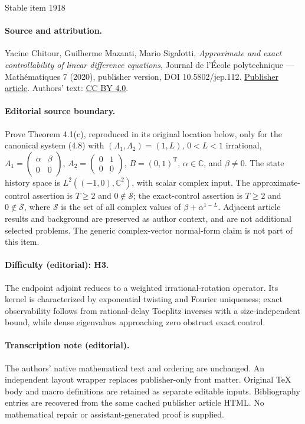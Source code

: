 \documentclass[10pt]{article}
\theoremstyle{plain}
\theoremstyle{definition}
\numberwithin{equation}{section}\numberwithin{figure}{section}\emergencystretch=3em
\begin{document}
\begin{center}{\Large Stable item 1918}\end{center}
\paragraph{Source and attribution.}
Yacine Chitour, Guilherme Mazanti, Mario Sigalotti, \emph{Approximate and exact controllability of linear difference equations}, Journal de l’École polytechnique — Mathématiques 7 (2020), publisher version, DOI 10.5802/jep.112. \href{https://jep.centre-mersenne.org/articles/10.5802/jep.112/}{Publisher article}. Authors' text: \href{https://creativecommons.org/licenses/by/4.0/}{CC BY 4.0}.
\paragraph{Editorial source boundary.}
Prove Theorem 4.1(c), reproduced in its original location below, only for the canonical system (4.8) with \((\Lambda_1,\Lambda_2)=(1,L)\), \(0<L<1\) irrational, \(A_1=\left(\begin{smallmatrix}\alpha&\beta\\0&0\end{smallmatrix}\right)\), \(A_2=\left(\begin{smallmatrix}0&1\\0&0\end{smallmatrix}\right)\), \(B=(0,1)^{\mathrm T}\), \(\alpha\in\mathbb C\), and \(\beta\ne0\). The state history space is \(L^2((-1,0),\mathbb C^2)\), with scalar complex input. The approximate-control assertion is \(T\ge2\) and \(0\notin\mathcal S\); the exact-control assertion is \(T\ge2\) and \(0\notin\overline{\mathcal S}\), where \(\mathcal S\) is the set of all complex values of \(\beta+\alpha^{1-L}\). Adjacent article results and background are preserved as author context, and are not additional selected problems. The generic complex-vector normal-form claim is not part of this item.
\paragraph{Difficulty (editorial): H3.}
The endpoint adjoint reduces to a weighted irrational-rotation operator. Its kernel is characterized by exponential twisting and Fourier uniqueness; exact observability follows from rational-delay Toeplitz inverses with a size-independent bound, while dense eigenvalues approaching zero obstruct exact control.
\paragraph{Transcription note (editorial).}
The authors' native mathematical text and ordering are unchanged. An independent layout wrapper replaces publisher-only front matter. Original TeX body and macro definitions are retained as separate editable inputs. Bibliography entries are recovered from the same cached publisher article HTML. No mathematical repair or assistant-generated proof is supplied.
\clearpage
\end{document}
